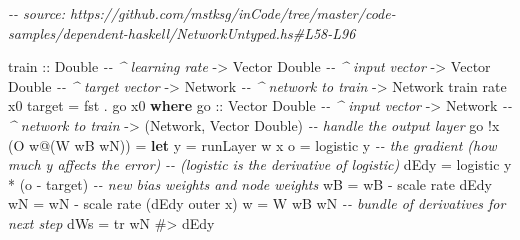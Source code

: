 \documentclass[]{article}
\newenvironment{Shaded}{}{}
\newcommand{\CommentTok}[1]{\textcolor[rgb]{0.38,0.63,0.69}{\textit{#1}}}
\newcommand{\DataTypeTok}[1]{\textcolor[rgb]{0.56,0.13,0.00}{#1}}
\newcommand{\FunctionTok}[1]{\textcolor[rgb]{0.02,0.16,0.49}{#1}}
\newcommand{\KeywordTok}[1]{\textcolor[rgb]{0.00,0.44,0.13}{\textbf{#1}}}
\newcommand{\NormalTok}[1]{#1}
\newcommand{\OperatorTok}[1]{\textcolor[rgb]{0.40,0.40,0.40}{#1}}
\newcommand{\OtherTok}[1]{\textcolor[rgb]{0.00,0.44,0.13}{#1}}
\begin{document}
\begin{Shaded}
\begin{Highlighting}[]
\CommentTok{{-}{-} source: https://github.com/mstksg/inCode/tree/master/code{-}samples/dependent{-}haskell/NetworkUntyped.hs\#L58{-}L96}

\OtherTok{train ::} \DataTypeTok{Double}           \CommentTok{{-}{-} \^{} learning rate}
      \OtherTok{{-}\textgreater{}} \DataTypeTok{Vector} \DataTypeTok{Double}    \CommentTok{{-}{-} \^{} input vector}
      \OtherTok{{-}\textgreater{}} \DataTypeTok{Vector} \DataTypeTok{Double}    \CommentTok{{-}{-} \^{} target vector}
      \OtherTok{{-}\textgreater{}} \DataTypeTok{Network}          \CommentTok{{-}{-} \^{} network to train}
      \OtherTok{{-}\textgreater{}} \DataTypeTok{Network}
\NormalTok{train rate x0 target }\OtherTok{=} \FunctionTok{fst} \OperatorTok{.}\NormalTok{ go x0}
  \KeywordTok{where}
\OtherTok{    go ::} \DataTypeTok{Vector} \DataTypeTok{Double}    \CommentTok{{-}{-} \^{} input vector}
       \OtherTok{{-}\textgreater{}} \DataTypeTok{Network}          \CommentTok{{-}{-} \^{} network to train}
       \OtherTok{{-}\textgreater{}}\NormalTok{ (}\DataTypeTok{Network}\NormalTok{, }\DataTypeTok{Vector} \DataTypeTok{Double}\NormalTok{)}
    \CommentTok{{-}{-} handle the output layer}
\NormalTok{    go }\OperatorTok{!}\NormalTok{x (}\DataTypeTok{O}\NormalTok{ w}\OperatorTok{@}\NormalTok{(}\DataTypeTok{W}\NormalTok{ wB wN))}
        \OtherTok{=} \KeywordTok{let}\NormalTok{ y    }\OtherTok{=}\NormalTok{ runLayer w x}
\NormalTok{              o    }\OtherTok{=}\NormalTok{ logistic y}
              \CommentTok{{-}{-} the gradient (how much y affects the error)}
              \CommentTok{{-}{-}   (logistic\textquotesingle{} is the derivative of logistic)}
\NormalTok{              dEdy }\OtherTok{=}\NormalTok{ logistic\textquotesingle{} y }\OperatorTok{*}\NormalTok{ (o }\OperatorTok{{-}}\NormalTok{ target)}
              \CommentTok{{-}{-} new bias weights and node weights}
\NormalTok{              wB\textquotesingle{}  }\OtherTok{=}\NormalTok{ wB }\OperatorTok{{-}}\NormalTok{ scale rate dEdy}
\NormalTok{              wN\textquotesingle{}  }\OtherTok{=}\NormalTok{ wN }\OperatorTok{{-}}\NormalTok{ scale rate (dEdy }\OtherTok{\textasciigrave{}outer\textasciigrave{}}\NormalTok{ x)}
\NormalTok{              w\textquotesingle{}   }\OtherTok{=} \DataTypeTok{W}\NormalTok{ wB\textquotesingle{} wN\textquotesingle{}}
              \CommentTok{{-}{-} bundle of derivatives for next step}
\NormalTok{              dWs  }\OtherTok{=}\NormalTok{ tr wN }\OperatorTok{\#\textgreater{}}\NormalTok{ dEdy}

\end{Highlighting}
\end{Shaded}
\end{document}
